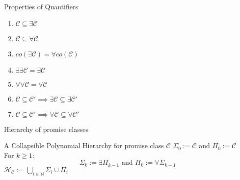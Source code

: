         \begin{frame}{Properties of Quantifiers}
            \begin{enumerate}
                \item $\mathcal{C} \subseteq \exists{\mathcal{C}}$
                \item $\mathcal{C} \subseteq \forall{\mathcal{C}}$
                \pause
                \item $co(\exists \mathcal{C}) = \forall co(\mathcal{C})$
                \pause
                \item $\exists \exists \mathcal{C} = \exists{\mathcal{C}}$
                \item $\forall \forall \mathcal{C} = \forall{\mathcal{C}}$
                \pause
                \item $\mathcal{C} \subseteq \mathcal{C}' \implies \exists{\mathcal{C}} \subseteq \exists{\mathcal{C}}'$
                \item $\mathcal{C} \subseteq \mathcal{C}' \implies \forall{\mathcal{C}} \subseteq \forall{\mathcal{C}}'$
            \end{enumerate}
        \end{frame}
        \begin{frame}{Hierarchy of promise classes}
            \begin{block}{A Collapsible Polynomial Hierarchy for promise class $\mathcal{C}$}
                $\Sigma_0 :=  \mathcal{C}$ and
                $\Pi_0 :=  \mathcal{C}$\\
                For $k \geq 1 $:
                    $$\Sigma_k := \exists\Pi_{k-1} \text{ and }
                    \Pi_k := \forall\Sigma_{k-1}$$
                $\mathcal{H}_{\mathcal{C}} := \bigcup\limits_{i \in \mathbb{N}} \Sigma_i \cup \Pi_i$
                
            \end{block}
        \end{frame}

        
